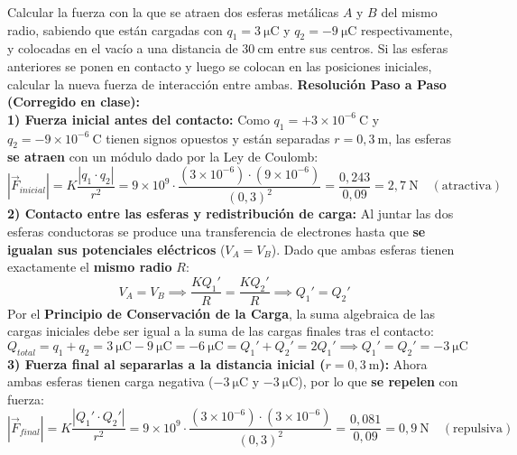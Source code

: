 \begin{ejercicio}
Calcular la fuerza con la que se atraen dos esferas metálicas $A$ y $B$ del mismo radio, sabiendo que están cargadas con $q_1 = 3\ \si{\micro\coulomb}$ y $q_2 = -9\ \si{\micro\coulomb}$ respectivamente, y colocadas en el vacío a una distancia de $30\ \si{\centi\meter}$ entre sus centros. Si las esferas anteriores se ponen en contacto y luego se colocan en las posiciones iniciales, calcular la nueva fuerza de interacción entre ambas.
\tcbline
\textbf{Resolución Paso a Paso (Corregido en clase):}\\[4pt]
\textbf{1) Fuerza inicial antes del contacto:}
Como $q_1 = +3 \times 10^{-6}\ \si{\coulomb}$ y $q_2 = -9 \times 10^{-6}\ \si{\coulomb}$ tienen signos opuestos y están separadas $r = 0{,}3\ \si{\meter}$, las esferas \textbf{se atraen} con un módulo dado por la Ley de Coulomb:
\begin{equation}
    |\vec{F}_{inicial}| = K \frac{|q_1 \cdot q_2|}{r^2} = 9 \times 10^9 \cdot \frac{(3 \times 10^{-6}) \cdot (9 \times 10^{-6})}{(0{,}3)^2} = \frac{0{,}243}{0{,}09} = 2{,}7\ \si{\newton}\quad (\text{atractiva})
\end{equation}
\textbf{2) Contacto entre las esferas y redistribución de carga:}
Al juntar las dos esferas conductoras se produce una transferencia de electrones hasta que \textbf{se igualan sus potenciales eléctricos} ($V_A = V_B$). Dado que ambas esferas tienen exactamente el \textbf{mismo radio} $R$:
\begin{equation}
    V_A = V_B \implies \frac{K Q_1'}{R} = \frac{K Q_2'}{R} \implies Q_1' = Q_2'
\end{equation}
Por el \textbf{Principio de Conservación de la Carga}, la suma algebraica de las cargas iniciales debe ser igual a la suma de las cargas finales tras el contacto:
\begin{equation}
    Q_{total} = q_1 + q_2 = 3\ \si{\micro\coulomb} - 9\ \si{\micro\coulomb} = -6\ \si{\micro\coulomb} = Q_1' + Q_2' = 2 Q_1' \implies Q_1' = Q_2' = -3\ \si{\micro\coulomb}
\end{equation}
\textbf{3) Fuerza final al separarlas a la distancia inicial ($r = 0{,}3\ \si{\meter}$):}
Ahora ambas esferas tienen carga negativa ($-3\ \si{\micro\coulomb}$ y $-3\ \si{\micro\coulomb}$), por lo que \textbf{se repelen} con fuerza:
\begin{equation}
    |\vec{F}_{final}| = K \frac{|Q_1' \cdot Q_2'|}{r^2} = 9 \times 10^9 \cdot \frac{(3 \times 10^{-6}) \cdot (3 \times 10^{-6})}{(0{,}3)^2} = \frac{0{,}081}{0{,}09} = 0{,}9\ \si{\newton}\quad (\text{repulsiva})
\end{equation}
\end{ejercicio}

